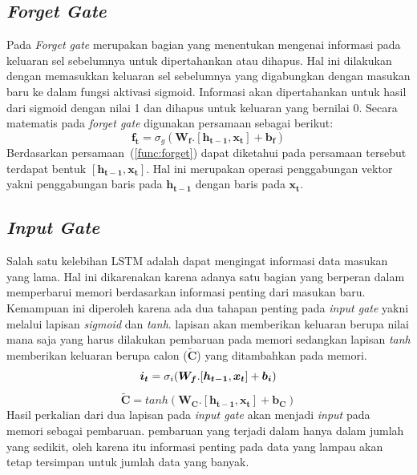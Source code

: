 \subsection{\textit{Forget Gate}}
Pada \textit{Forget gate} merupakan bagian yang menentukan mengenai informasi pada keluaran sel sebelumnya untuk dipertahankan atau dihapus. Hal ini dilakukan dengan memasukkan keluaran sel sebelumnya yang digabungkan dengan masukan baru ke dalam fungsi aktivasi sigmoid. Informasi akan dipertahankan untuk hasil dari sigmoid dengan nilai 1 dan dihapus untuk keluaran yang bernilai 0. Secara matematis pada \textit{forget gate} digunakan persamaan sebagai berikut:
\begin{equation}
	\boldsymbol{f_t} = \sigma_g(\boldsymbol{W_{f}}.[\boldsymbol{h_{t-1}}, \boldsymbol{x_t}] + \boldsymbol{b_f})
	\label{func:forget}
\end{equation} 
Berdasarkan persamaan~(\ref{func:forget}) dapat diketahui pada persamaan tersebut terdapat bentuk $[\boldsymbol{h_{t-1}}, \boldsymbol{x_t}]$. Hal ini merupakan operasi penggabungan vektor yakni penggabungan baris pada $\boldsymbol{h_{t-1}}$ dengan baris pada $\boldsymbol{x_t}$.
\subsection{\textit{Input Gate}}
Salah satu kelebihan LSTM adalah dapat mengingat informasi data masukan yang lama. Hal ini dikarenakan karena adanya satu bagian yang berperan dalam memperbarui memori berdasarkan informasi penting dari masukan baru. Kemampuan ini diperoleh karena ada dua tahapan penting pada \textit{input gate} yakni melalui lapisan \textit{sigmoid} dan \textit{tanh}. lapisan akan memberikan keluaran berupa nilai mana saja yang harus dilakukan pembaruan pada memori sedangkan lapisan \textit{tanh} memberikan keluaran berupa calon ($\boldsymbol{\tilde{C}}$) yang ditambahkan pada memori. 
\begin{equation}
	\boldsymbol{i_t} = \sigma_i(\boldsymbol{W_{f}}.[\boldsymbol{h_{t-1}}, \boldsymbol{x_t}] + \boldsymbol{b_i})\\
	\label{func:input}
\end{equation}
\begin{equation}
	\boldsymbol{\tilde{C}} = tanh(\boldsymbol{W_{C}}.[\boldsymbol{h_{t-1}}, \boldsymbol{x_t}] + \boldsymbol{b_C})
	\label{func:C-tilde}
\end{equation}
Hasil perkalian dari dua lapisan pada \textit{input gate} akan menjadi \textit{input} pada memori sebagai pembaruan. pembaruan yang terjadi dalam hanya dalam jumlah yang sedikit, oleh karena itu informasi penting pada data yang lampau akan tetap tersimpan untuk jumlah data yang banyak.
